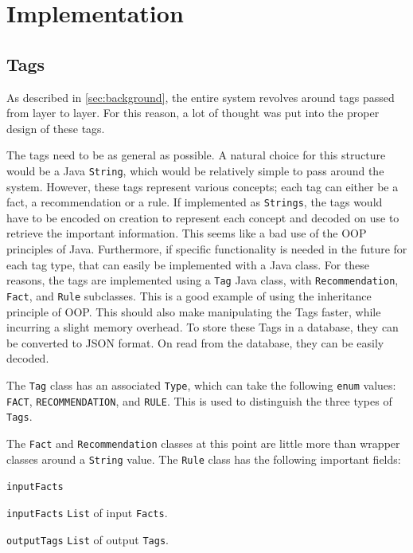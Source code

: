 \documentclass[titlepage,11pt]{article}
\newcommand{\code}[1]{\texttt{#1}}
\begin{document}
\section{Implementation}
\label{sec:implementation}

\subsection{Tags}

As described in \autoref{sec:background}, the entire system revolves around tags passed from layer to layer. For this reason, a lot of thought was put into the proper design of these tags.

The tags need to be as general as possible. A natural choice for this structure would be a Java \code{String}, which would be relatively simple to pass around the system. However, these tags represent various concepts; each tag can either be a fact, a recommendation or a rule. If implemented as \code{Strings}, the tags would have to be encoded on creation to represent each concept and decoded on use to retrieve the important information. This seems like a bad use of the OOP principles of Java. Furthermore, if specific functionality is needed in the future for each tag type, that can easily be implemented with a Java class. For these reasons, the tags are implemented using a \code{Tag} Java class, with \code{Recommendation}, \code{Fact}, and \code{Rule} subclasses. This is a good example of using the inheritance principle of OOP. This should also make manipulating the Tags faster, while incurring a slight memory overhead. To store these Tags in a database, they can be converted to JSON format. On read from the database, they can be easily decoded.

The \code{Tag} class has an associated \code{Type}, which can take the following \code{enum} values: \code{FACT}, \code{RECOMMENDATION}, and \code{RULE}. This is used to distinguish the three types of \code{Tags}.

The \code{Fact} and \code{Recommendation} classes at this point are little more than wrapper classes around a \code{String} value. The \code{Rule} class has the following important fields:

\begin{labeling}{\code{inputFacts}}
	\item[\code{inputFacts}] \code{List} of input \code{Facts}.
	\item[\code{outputTags}] \code{List} of output \code{Tags}.
\end{labeling}
\end{document}
